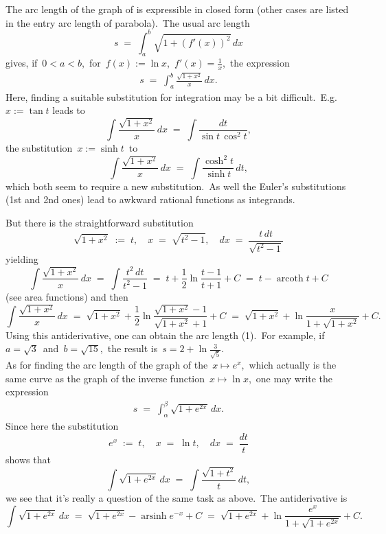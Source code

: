 \documentclass[12pt]{article}
\DeclareMathOperator{\arsinh}{arsinh}
\DeclareMathOperator{\arcoth}{arcoth}
\begin{document}
The arc length of the graph of  is expressible in closed form (other cases are listed in the entry arc length of parabola).\, The usual arc length 
$$s \;=\; \int_a^b\!\sqrt{1+(f'(x))^2}\,dx$$
gives, if\, $0 < a < b$,\, for\, $f(x) := \ln{x}$,\, $f'(x) = \frac{1}{x}$,\, the expression
\begin{align}
s \;=\; \int_a^b\!\frac{\sqrt{1\!+\!x^2}}{x}\,dx.
\end{align}
Here, finding a suitable substitution for integration may be a bit difficult.\, E.g.\, $x := \tan{t}$
leads to
$$\int\!\frac{\sqrt{1\!+\!x^2}}{x}\,dx \;=\; \int\frac{dt}{\sin{t}\,\cos^2{t}},$$
the substitution\, $x := \sinh{t}$\, to
$$\int\!\frac{\sqrt{1\!+\!x^2}}{x}\,dx \;=\; \int\frac{\cosh^2{t}}{\sinh{t}}\,dt,$$
which both seem to require a new substitution.\, As well the Euler's substitutions (1st and 2nd ones) lead to awkward rational functions as integrands.

But there is the straightforward  substitution
$$\sqrt{1\!+\!x^2} \;:=\; t, \quad x \;=\; \sqrt{t^2\!-\!1}, \quad dx \;=\; \frac{t\,dt}{\sqrt{t^2\!-\!1}}$$
yielding
$$\int\!\frac{\sqrt{1\!+\!x^2}}{x}\,dx \;=\; \int\!\frac{t^2\,dt}{t^2\!-\!1}
\;=\; t+\frac{1}{2}\ln\frac{t\!-\!1}{t\!+\!1}+C \;=\; t-\arcoth{t}+C$$
(see area functions) and then
$$\int\!\frac{\sqrt{1\!+\!x^2}}{x}\,dx \;=\; 
\sqrt{1\!+\!x^2}+\frac{1}{2}\ln\frac{\sqrt{1\!+\!x^2}-1}{\sqrt{1\!+\!x^2}+1}+C \;=\; 
\sqrt{1\!+\!x^2}+\ln\frac{x}{1+\sqrt{1\!+\!x^2}}+C.$$
Using this antiderivative, one can obtain the arc length (1).\, For example, if\, $a = \sqrt{3}$\, and\, 
$b = \sqrt{15}$,\, the result is\, $s = 2+\ln\frac{3}{\sqrt{5}}$.\\

As for finding the arc length of the graph of the  \,$x \mapsto e^x$,\, which actually is the same curve as the graph of the inverse function \,$x \mapsto \ln{x}$,\, one may write the expression
\begin{align}
s \;=\; \int_\alpha^\beta\!\sqrt{1\!+\!e^{2x}}\,dx.
\end{align}
Since here the substitution
$$e^x \;:=\; t, \quad x \;=\; \ln{t}, \quad dx \;=\; \frac{dt}{t}$$
shows that
$$\int\!\sqrt{1\!+\!e^{2x}}\,dx \;=\; \int\!\frac{\sqrt{1\!+\!t^2}}{t}\,dt,$$
we see that it's really a question of the same task as above.\, The antiderivative is
$$\int\!\sqrt{1\!+\!e^{2x}}\,dx \;=\; \sqrt{1\!+\!e^{2x}}-\arsinh{e^{-x}}+C 
\;=\; \sqrt{1\!+\!e^{2x}}+\ln\frac{e^x}{1+\sqrt{1\!+\!e^{2x}}}+C.$$



\end{document}

